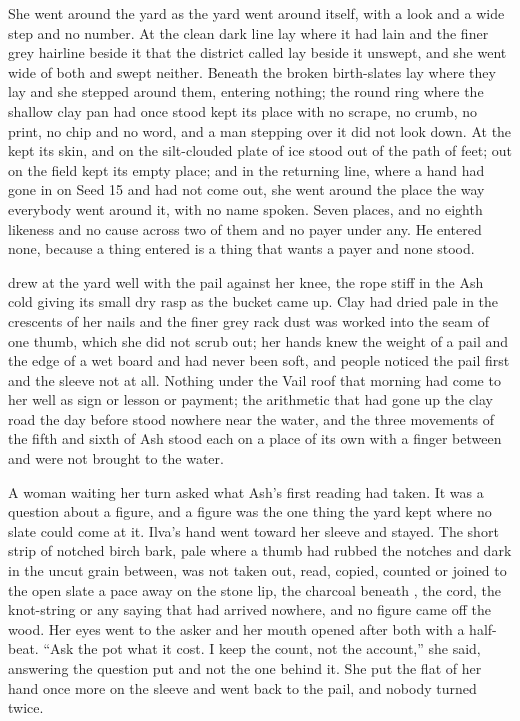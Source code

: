 She went around the yard as the yard went around itself, with a look and a wide step and no number. At  the clean dark line lay where it had lain and the finer grey hairline beside it that the district called  lay beside it unswept, and she went wide of both and swept neither. Beneath  the broken birth-slates lay where they lay and she stepped around them, entering nothing; the round ring where the shallow clay pan had once stood kept its place with no scrape, no crumb, no print, no chip and no word, and a man stepping over it did not look down. At  the  kept its skin, and on  the silt-clouded plate of ice stood out of the path of feet; out on  the field kept its empty place; and in the returning line, where a hand had gone in on Seed 15 and had not come out, she went around the place the way everybody went around it, with no name spoken. Seven places, and no eighth likeness and no cause across two of them and no payer under any. He entered none, because a thing entered is a thing that wants a payer and none stood.

\scenebreak

 drew at the yard well with the pail against her knee, the rope stiff in the Ash cold giving its small dry rasp as the bucket came up. Clay had dried pale in the crescents of her nails and the finer grey rack dust was worked into the seam of one thumb, which she did not scrub out; her hands knew the weight of a pail and the edge of a wet board and had never been soft, and people noticed the pail first and the sleeve not at all. Nothing under the Vail roof that morning had come to her well as sign or lesson or payment; the arithmetic that had gone up the clay road the day before stood nowhere near the water, and the three movements of the fifth and sixth of Ash stood each on a place of its own with a finger between and were not brought to the water.

A woman waiting her turn asked what Ash's first reading had taken. It was a question about a figure, and a figure was the one thing the yard kept where no slate could come at it. Ilva's hand went toward her sleeve and stayed. The short strip of notched birch bark, pale where a thumb had rubbed the notches and dark in the uncut grain between, was not taken out, read, copied, counted or joined to the open slate a pace away on the stone lip, the charcoal beneath , the cord, the knot-string or any saying that had arrived nowhere, and no figure came off the wood. Her eyes went to the asker and her mouth opened after both with a half-beat. “Ask the pot what it cost. I keep the count, not the account,” she said, answering the question put and not the one behind it. She put the flat of her hand once more on the sleeve and went back to the pail, and nobody turned twice.

